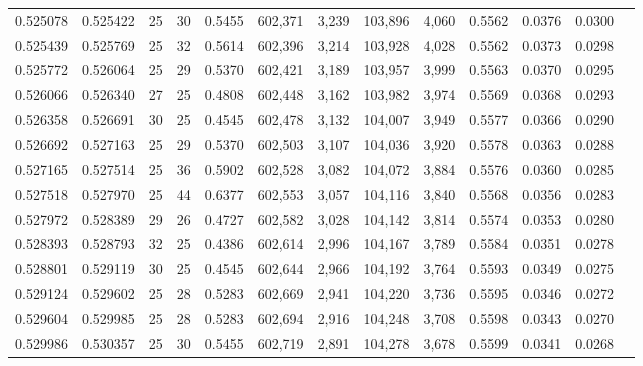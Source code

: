 \begin{tabular}{rrrrrrrrrrrrr}
0.525078 & 0.525422 &    25 &  30 &                                     0.5455 & 602,371 &   3,239 & 103,896 &   4,060 & 0.5562 & 0.0376 & 0.0300 \\
0.525439 & 0.525769 &    25 &  32 &                                     0.5614 & 602,396 &   3,214 & 103,928 &   4,028 & 0.5562 & 0.0373 & 0.0298 \\
0.525772 & 0.526064 &    25 &  29 &                                     0.5370 & 602,421 &   3,189 & 103,957 &   3,999 & 0.5563 & 0.0370 & 0.0295 \\
0.526066 & 0.526340 &    27 &  25 &                                     0.4808 & 602,448 &   3,162 & 103,982 &   3,974 & 0.5569 & 0.0368 & 0.0293 \\
0.526358 & 0.526691 &    30 &  25 &                                     0.4545 & 602,478 &   3,132 & 104,007 &   3,949 & 0.5577 & 0.0366 & 0.0290 \\
0.526692 & 0.527163 &    25 &  29 &                                     0.5370 & 602,503 &   3,107 & 104,036 &   3,920 & 0.5578 & 0.0363 & 0.0288 \\
0.527165 & 0.527514 &    25 &  36 &                                     0.5902 & 602,528 &   3,082 & 104,072 &   3,884 & 0.5576 & 0.0360 & 0.0285 \\
0.527518 & 0.527970 &    25 &  44 &                                     0.6377 & 602,553 &   3,057 & 104,116 &   3,840 & 0.5568 & 0.0356 & 0.0283 \\
0.527972 & 0.528389 &    29 &  26 &                                     0.4727 & 602,582 &   3,028 & 104,142 &   3,814 & 0.5574 & 0.0353 & 0.0280 \\
0.528393 & 0.528793 &    32 &  25 &                                     0.4386 & 602,614 &   2,996 & 104,167 &   3,789 & 0.5584 & 0.0351 & 0.0278 \\
0.528801 & 0.529119 &    30 &  25 &                                     0.4545 & 602,644 &   2,966 & 104,192 &   3,764 & 0.5593 & 0.0349 & 0.0275 \\
0.529124 & 0.529602 &    25 &  28 &                                     0.5283 & 602,669 &   2,941 & 104,220 &   3,736 & 0.5595 & 0.0346 & 0.0272 \\
0.529604 & 0.529985 &    25 &  28 &                                     0.5283 & 602,694 &   2,916 & 104,248 &   3,708 & 0.5598 & 0.0343 & 0.0270 \\
0.529986 & 0.530357 &    25 &  30 &                                     0.5455 & 602,719 &   2,891 & 104,278 &   3,678 & 0.5599 & 0.0341 & 0.0268 \\

\end{tabular}
